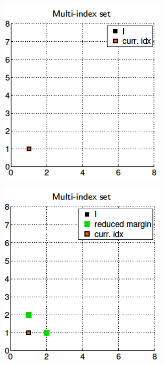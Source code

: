 \documentclass[ima, 20pt, portrait, plainboxedsections]{sciposter}
\begin{document}
\begin{multicols}{3}
\begin{itemize}
\begin{figure}
	\centering
	\begin{subfigure}{0.32\textwidth}
		\centering
		\includegraphics[width=0.9\textwidth]{./MISC_construction/1}
		\caption{}
	\end{subfigure}\hfil
	\begin{subfigure}{0.32\textwidth}
		\centering
		\includegraphics[width=0.9\textwidth]{./MISC_construction/2}

\end{subfigure}
\end{figure}
\end{itemize}
\end{multicols}
\end{document}
